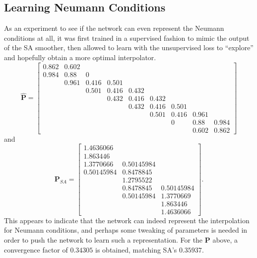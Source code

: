\documentclass{article}
\newcommand{\mat}[1]{\bm{{#1}}}
\begin{document}
\subsection{Learning Neumann Conditions}
As an experiment to see if the network can even represent the Neumann conditions at all, it was first trained in a supervised fashion to mimic the output of the SA smoother, then allowed to learn with the unsupervised loss to ``explore'' and hopefully obtain a more optimal interpolator.
\begin{equation}
\mat{\hat{P}} = \begin{bmatrix}
0.862 & 0.602 &  &  &  &  &  &  &  \\
0.984 & 0.88 & 0 &  &  &  &  &  &  \\
 & 0.961 & 0.416 & 0.501 &  &  &  &  &  \\
 &  & 0.501 & 0.416 & 0.432 &  &  &  &  \\
 &  &  & 0.432 & 0.416 & 0.432 &  &  &  \\
 &  &  &  & 0.432 & 0.416 & 0.501 &  &  \\
 &  &  &  &  & 0.501 & 0.416 & 0.961 &  \\
 &  &  &  &  &  & 0 & 0.88 & 0.984 \\
 &  &  &  &  &  &  & 0.602 & 0.862
\end{bmatrix}
\end{equation}
and
\begin{equation}
  \mat{P}_{SA} = \begin{bmatrix}
1.4636066 &  &  \\
1.863446 &  &  \\
1.3770666 & 0.50145984 &  \\
0.50145984 & 0.8478845 &  \\
 & 1.2795522 &  \\
 & 0.8478845 & 0.50145984 \\
 & 0.50145984 & 1.3770669 \\
 &  & 1.863446 \\
 &  & 1.4636066
\end{bmatrix}.
\end{equation}
This appears to indicate that the network can indeed represent the interpolation for Neumann conditions, and perhaps some tweaking of parameters is needed in order to push the network to learn such a representation.  For the $\mat{P}$ above, a convergence factor of $0.34305$ is obtained, matching SA's $0.35937$.
\appendix
\end{document}
